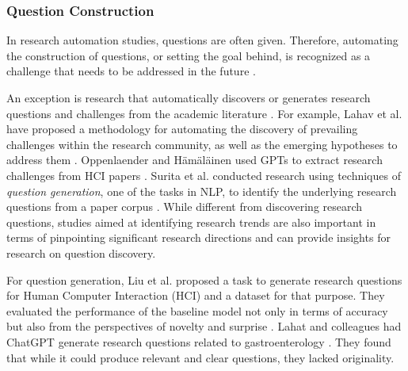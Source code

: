 
\subsubsection{Question Construction}

In research automation studies, questions are often given. Therefore, automating the construction of questions, or setting the goal behind, is recognized as a challenge that needs to be addressed in the future \cite{coley2020autonomousII,zenil2023,kitano2021nobel}. 

An exception is research that automatically discovers or generates research questions and challenges from the academic literature \cite{lahav2022search,liu2023creative,oppenlaender2023mapping,surita2020can}. For example, Lahav et al. have proposed a methodology for automating the discovery of prevailing challenges within the research community, as well as the emerging hypotheses to address them \cite{lahav2022search}. Oppenlaender and Hämäläinen used GPTs to extract research challenges from HCI papers \cite{oppenlaender2023mapping}. Surita et al. conducted research using techniques of \textit{question generation}, one of the tasks in NLP, to identify the underlying research questions from a paper corpus \cite{surita2020can}. While different from discovering research questions, studies aimed at identifying research trends \cite{krenn2022scientific,krenn2022predicting} are also important in terms of pinpointing significant research directions and can provide insights for research on question discovery.

For question generation, Liu et al. proposed a task to generate research questions for Human Computer Interaction (HCI) and a dataset for that purpose. They evaluated the performance of the baseline model not only in terms of accuracy but also from the perspectives of novelty and surprise \cite{liu2023creative}. Lahat and colleagues had ChatGPT generate research questions related to gastroenterology \cite{lahat2023evaluating}. They found that while it could produce relevant and clear questions, they lacked originality.

